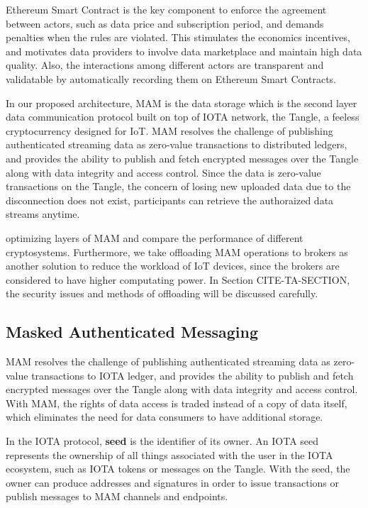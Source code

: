 Ethereum Smart Contract is the key component to enforce the agreement between actors, such as data price and subscription period, and demands penalties when the rules are violated. This stimulates the economics incentives, and motivates data providers to involve data marketplace and maintain high data quality. Also, the interactions among different actors are transparent and validatable by automatically recording them on Ethereum Smart Contracts. 

In our proposed architecture, MAM is the data storage which is the second layer data communication protocol built on top of IOTA\cite{IOTAwhitepaper} network, the Tangle, a feeless cryptocurrency designed for IoT. MAM resolves the challenge of publishing authenticated streaming data as zero-value transactions to distributed ledgers, and provides the ability to publish and fetch encrypted messages over the Tangle along with data integrity and access control. Since the data is zero-value transactions on the Tangle, the concern of losing new uploaded data due to the disconnection does not exist, participants can retrieve the authoraized data streams anytime. 

optimizing layers of MAM and compare the performance of different cryptosystems. Furthermore, we take offloading MAM operations to brokers as another solution to reduce the workload of IoT devices, since the brokers are considered to have higher computating power. In Section CITE-TA-SECTION, the security issues and methods of offloading will be discussed carefully.

\subsection{Masked Authenticated Messaging}
MAM resolves the challenge of publishing authenticated streaming data as zero-value transactions to IOTA ledger, and provides the ability to publish and fetch encrypted messages over the Tangle along with data integrity and access control. With MAM, the rights of data access is traded instead of a copy of data itself, which eliminates the need for data consumers to have additional storage.
 
In the IOTA protocol, \textbf{seed} is the identifier of its owner. An IOTA seed represents the ownership of all things associated with the user in the IOTA ecosystem, such as IOTA tokens or messages on the Tangle. With the seed, the owner can produce addresses and signatures in order to issue transactions or publish messages to MAM channels and endpoints.

